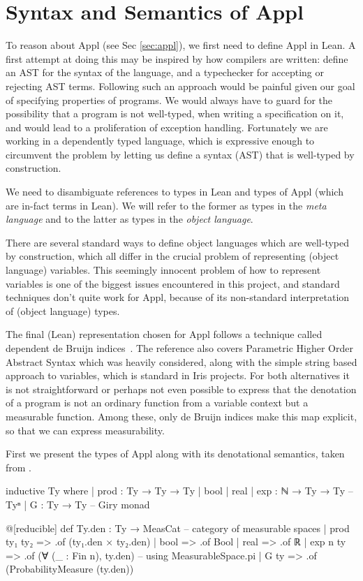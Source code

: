 \section{Syntax and Semantics of Appl}
\label{sec:appl-lean}
To reason about Appl (see Sec \ref{sec:appl}), we first need to define Appl in Lean. A first attempt at doing this may be inspired by how compilers are written:
define an AST for the syntax of the language, and a typechecker for accepting or rejecting AST terms. Following such an approach would be painful given our goal
of specifying properties of programs. We would always have to guard for the possibility that a program is not well-typed, when writing a specification on it, and would lead to a
proliferation of exception handling. Fortunately we are working in a dependently typed language, which is expressive enough to circumvent the problem by
letting us define a syntax (AST) that is well-typed by construction.

We need to disambiguate references to types in Lean and types of Appl (which are in-fact terms in Lean). We will refer to the former as types in
the \emph{meta language} and to the latter as types in the \emph{object language}.

There are several standard ways to define object languages which are well-typed by construction, which all differ in the crucial problem of representing
(object language) variables. This seemingly innocent problem of how to represent variables is one of the biggest issues encountered in this project, and
standard techniques don't quite work for Appl, because of its non-standard interpretation of (object language) types.

The final (Lean) representation chosen for Appl follows a technique called dependent de Bruijn indices~\citep[see chap 17, Reasoning about programming language syntax]{cpdt}.
The reference also covers Parametric Higher Order Abstract Syntax which was heavily considered, along with the simple string based approach to variables,
which is standard in Iris projects. For both alternatives it is not straightforward or perhaps not even possible to express that the denotation of
a program is not an ordinary function from a variable context but a measurable function. Among these, only de Bruijn indices make this map explicit, so that
we can express measurability.

First we present the types of Appl along with its denotational semantics, taken from .
\begin{leancode}
inductive Ty where
  | prod : Ty → Ty → Ty
  | bool
  | real
  | exp : ℕ → Ty → Ty -- Tyⁿ
  | G : Ty → Ty -- Giry monad
  
@[reducible] def Ty.den : Ty → MeasCat -- category of measurable spaces
  | prod ty₁ ty₂ => .of (ty₁.den × ty₂.den)
  | bool => .of Bool
  | real => .of ℝ
  | exp n ty => .of (∀ (_ : Fin n), ty.den) -- using MeasurableSpace.pi
  | G ty => .of (ProbabilityMeasure (ty.den))
\end{leancode}

